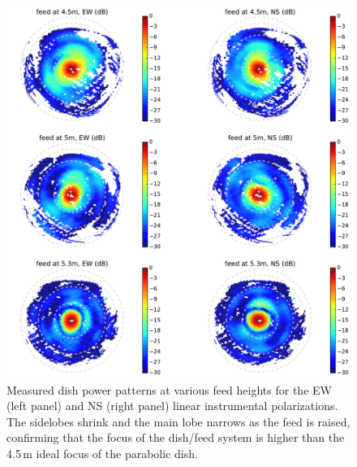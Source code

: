 \documentclass{emulateapj}
\begin{document}
\begin{figure}[t]
\centering
\includegraphics[width=6.5in]{measured_beams_and_models_maps.pdf}
\caption{Measured dish power patterns at various feed heights for the EW (left panel) and NS (right panel) linear instrumental polarizations. The sidelobes shrink and the main lobe narrows as the feed is raised, confirming that the focus of the dish/feed system is higher than the 4.5\,m ideal focus of the parabolic dish.}
\label{fig:measuredbeammaps}
\end{figure}
\end{document}
